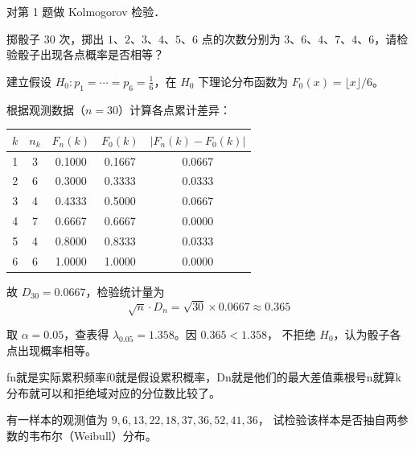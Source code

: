 \begin{homework}[extra]
对第 1 题做 Kolmogorov 检验．

掷骰子 $30$ 次，掷出 $1$、$2$、$3$、$4$、$5$、$6$ 点的次数分别为 $3$、$6$、$4$、$7$、$4$、$6$，请检验骰子出现各点概率是否相等？
\end{homework}
\begin{solution}
建立假设 $H_0: p_1 = \cdots = p_6 = \frac{1}{6}$，在 $H_0$ 下理论分布函数为
$F_0(x) = \lfloor x \rfloor / 6$。

根据观测数据（$n=30$）计算各点累计差异：

\begin{table}[h]
\centering
\begin{tabular}{ccccc}
\hline
$k$ & $n_k$ & $F_n(k)$ & $F_0(k)$ & $|F_n(k)-F_0(k)|$ \\
\hline
1 & 3 & 0.1000 & 0.1667 & 0.0667 \\
2 & 6 & 0.3000 & 0.3333 & 0.0333 \\
3 & 4 & 0.4333 & 0.5000 & 0.0667 \\
4 & 7 & 0.6667 & 0.6667 & 0.0000 \\
5 & 4 & 0.8000 & 0.8333 & 0.0333 \\
6 & 6 & 1.0000 & 1.0000 & 0.0000 \\
\hline
\end{tabular}
\end{table}

故 $D_{30} = 0.0667$，检验统计量为
$$\sqrt{n}\cdot D_n = \sqrt{30}\times 0.0667 \approx 0.365$$

取 $\alpha=0.05$，查表得 $\lambda_{0.05}=1.358$。因 $0.365 < 1.358$，
不拒绝 $H_0$，认为骰子各点出现概率相等。
\end{solution}
\begin{dxtips}
    fn就是实际累积频率f0就是假设累积概率，Dn就是他们的最大差值乘根号n就算k分布就可以和拒绝域对应的分位数比较了。
\end{dxtips}
\begin{homework}[3]
有一样本的观测值为 $9, 6, 13, 22, 18, 37, 36, 52, 41, 36$，
试检验该样本是否抽自两参数的韦布尔（Weibull）分布。
\end{homework}
